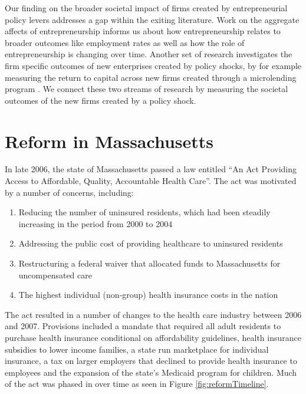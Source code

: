 \documentclass[12pt]{article}
\begin{document}
Our finding on the broader societal impact of firms created by entrepreneurial policy levers addresses a gap within the exiting literature. Work on the aggregate affects of entrepreneurship  \citep{haltiwanger2013creates} informs us about how entrepreneurship relates to broader outcomes like employment rates as well as how the role of entrepreneurship is changing over time. Another set of research investigates the firm specific outcomes of new enterprises created by policy shocks, by for example measuring the return to capital across new firms created through a microlending program \citep{de2008returns}. We connect these two streams of research by measuring the societal outcomes of the new firms created by a policy shock. 

\section{Reform in Massachusetts}
\label{sec:reform}


In late 2006, the state of Massachusetts passed a law entitled ``An Act Providing Access to Affordable, Quality, Accountable Health Care''. The act was motivated by a number of concerns, including:

\begin{enumerate}
\item Reducing the number of uninsured residents, which had been steadily increasing in the period from 2000 to 2004 \citep{symonds2005}
\item Addressing the public cost of providing healthcare to uninsured residents \citep{knox2006romney}
\item Restructuring a federal waiver that allocated funds to Massachusetts for uncompensated care \citep{owcharenko2006massachusetts}
\item The highest individual (non-group) health insurance costs in the nation \citep{gruber2011massachusetts}
\end{enumerate}

The act resulted in a number of changes to the health care industry between 2006 and 2007. Provisions included a mandate that required all adult residents to purchase health insurance conditional on affordability guidelines, health insurance subsidies to lower income families, a state run marketplace for individual insurance, a tax on larger employers that declined to provide health insurance to employees and the expansion of the state's Medicaid program for children. Much of the act was phased in over time as seen in Figure \ref{fig:reformTimeline}.
\end{document}
